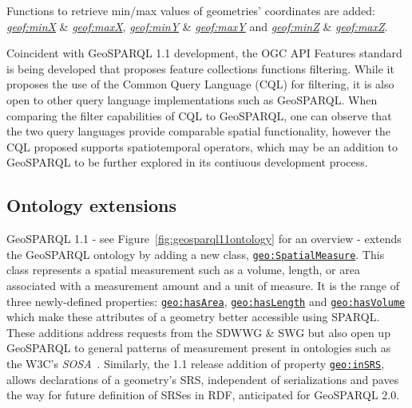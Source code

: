 \documentclass[runningheads]{llncs}
\begin{document}
Functions to retrieve min/max values of geometries' coordinates are added: \href{http://www.opengis.net/def/function/geosparql/minX}{\emph{geof:minX}} \& \href{http://www.opengis.net/def/function/geosparql/maxX}{\emph{geof:maxX}},
\href{http://www.opengis.net/def/function/geosparql/minY}{\emph{geof:minY}} \& \href{http://www.opengis.net/def/function/geosparql/maxY}{\emph{geof:maxY}} and \href{http://www.opengis.net/def/function/geosparql/minZ}{\emph{geof:minZ}} \& \href{http://www.opengis.net/def/function/geosparql/maxZ}{\emph{geof:maxZ}}.

Coincident with GeoSPARQL 1.1 development, the OGC API Features standard \cite{ogcapifeaturespart3} is being developed that proposes feature collections functions filtering. 
While it proposes the use of the Common Query Language (CQL) for filtering, it is also open to other query language implementations such as GeoSPARQL. When comparing the 
filter capabilities of CQL to GeoSPARQL, one can observe that the two query languages provide comparable spatial functionality, however the CQL proposed supports 
spatiotemporal operators, which may be an addition to GeoSPARQL to be further explored in its contiuous development process.

\subsection{Ontology extensions}\label{sec:ontexts}
GeoSPARQL 1.1 - see Figure~\ref{fig:geosparql11ontology} for an overview - extends the GeoSPARQL ontology by adding a new class, \href{http://www.opengis.net/ont/geosparql#SpatialMeasure}{\texttt{geo:SpatialMeasure}}. This class represents a spatial measurement 
such as a volume, length, or area associated with a measurement amount and a unit of measure. It is the range of three newly-defined properties:
\href{http://www.opengis.net/ont/geosparql#hasArea}{\texttt{geo:hasArea}}, \href{http://www.opengis.net/ont/geosparql#hasLength}{\texttt{geo:hasLength}} and \href{http://www.opengis.net/ont/geosparql#hasVolume}{\texttt{geo:hasVolume}} which make these attributes of a geometry better accessible using 
SPARQL. These additions address requests from the SDWWG \& SWG but
also open up GeoSPARQL to general patterns of measurement present in ontologies 
such as the W3C's \textit{SOSA}~\cite{haller_semantic_2017}. Similarly, 
the 1.1 release addition of property \href{http://www.opengis.net/def/function/geosparql/inSRS}{\texttt{geo:inSRS}}, allows declarations of a geometry's SRS, independent of serializations and paves the way 
for future definition of SRSes in RDF, anticipated for GeoSPARQL 2.0.
\end{document}
